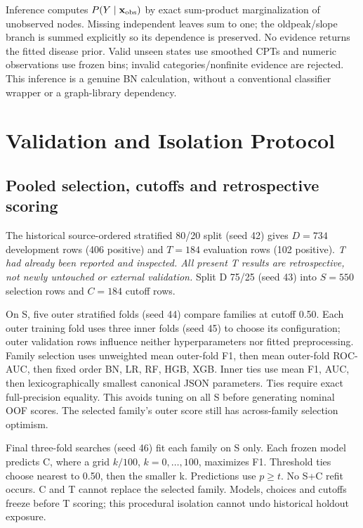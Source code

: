 \documentclass[conference]{IEEEtran}
\begin{document}
Inference computes $P(Y\mid\mathbf x_{\rm obs})$ by exact sum-product marginalization of unobserved nodes. Missing independent leaves sum to one; the oldpeak/slope branch is summed explicitly so its dependence is preserved. No evidence returns the fitted disease prior. Valid unseen states use smoothed CPTs and numeric observations use frozen bins; invalid categories/nonfinite evidence are rejected. This inference is a genuine BN calculation, without a conventional classifier wrapper or a graph-library dependency.

\section{Validation and Isolation Protocol}
\subsection{Pooled selection, cutoffs and retrospective scoring}
The historical source-ordered stratified 80/20 split (seed 42) gives $D=734$ development rows (406 positive) and $T=184$ evaluation rows (102 positive). \emph{T had already been reported and inspected. All present T results are retrospective, not newly untouched or external validation.} Split D 75/25 (seed 43) into $S=550$ selection rows and $C=184$ cutoff rows.

On S, five outer stratified folds (seed 44) compare families at cutoff 0.50. Each outer training fold uses three inner folds (seed 45) to choose its configuration; outer validation rows influence neither hyperparameters nor fitted preprocessing. Family selection uses unweighted mean outer-fold F1, then mean outer-fold ROC-AUC, then fixed order BN, LR, RF, HGB, XGB. Inner ties use mean F1, AUC, then lexicographically smallest canonical JSON parameters. Ties require exact full-precision equality. This avoids tuning on all S before generating nominal OOF scores. The selected family's outer score still has across-family selection optimism.

Final three-fold searches (seed 46) fit each family on S only. Each frozen model predicts C, where a grid $k/100$, $k=0,\ldots,100$, maximizes F1. Threshold ties choose nearest to 0.50, then the smaller k. Predictions use $p\geq t$. No S+C refit occurs. C and T cannot replace the selected family. Models, choices and cutoffs freeze before T scoring; this procedural isolation cannot undo historical holdout exposure.
\end{document}
